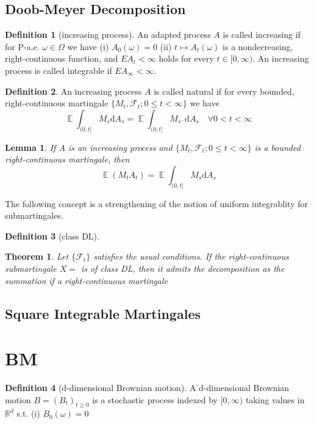 \documentclass{article}
\newtheorem{Thm}{Theorem}[section]
\newtheorem{Lem}{Lemma}[section]
\theoremstyle{definition}
\newtheorem{Def}{Definition}[section]
\newcommand{\EE}{\operatorname{\mathbb{E}}}
\renewcommand{\leq}{\leqslant}
\renewcommand{\geq}{\geqslant}
\newcommand{\<}{\left\langle}
\renewcommand{\>}{\right\rangle}
\begin{document}
\subsection{Doob-Meyer Decomposition}
\begin{Def}[increasing process]
    An adapted process $A$ is called increasing if for P-a.e. $\omega\in\Omega$ we have \newline 
    (i) $A_0(\omega)=0$\newline 
    (ii) $t\mapsto A_t(\omega)$ is a nondecreasing, right-continuous function, and $EA_t<\infty$ holds for every $t\in [0,\infty)$.\newline 
    An increasing process is called integrable if $EA_\infty<\infty$.
\end{Def}
\begin{Def}
    An increasing process $A$ is called natural if for every bounded, right-continuous martingale $\{M_t,\mathcal{F}_t;0\leq t<\infty\}$ we have
    \[ \EE\int_{(0,t]}M_s\mathrm{d}A_s=\EE\int_{(0,t]}M_{s^-}\mathrm{d}A_s\quad\forall 0<t<\infty\]
\end{Def}
\begin{Lem}
    If $A$ is an increasing process and $\{M_t,\mathcal{F}_t;0\leq t<\infty\}$ is a bounded right-continuous martingale, then 
    \[ \EE(M_tA_t)=\EE\int_{(0,t]}M_s\mathrm{d}A_s \]
\end{Lem}
The following concept is a strengthening of the notion of uniform integrablity for submartingales.
\begin{Def}[class DL]
    
\end{Def}
\begin{Thm}
    Let $\{\mathcal{F}_t\}$ satisfies the usual conditions. If the right-continuous submartingale $X=$ is of class DL,
    then it admits the decomposition as the summation if a right-continuous martingale
\end{Thm}

\subsection{Square Integrable Martingales}




\section{BM}
\begin{Def}[d-dimensional Brownian motion]
    A d-dimensional Brownian motion $B=(B_t)_{t\geq 0}$ is a stochastic process indexed by $[0,\infty)$ taking values in $\mathbb{R}^d$ s.t. \newline 
    (i) $B_0(\omega)=0$

\end{Def}
\end{document}
